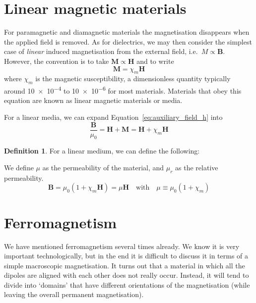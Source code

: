 \documentclass[12pt,chapterprefix=false,dvipsnames]{scrbook}
\theoremstyle{dotless}
\theoremstyle{definition}
\newtheorem{protodefinition}{Definition}[section]
\newenvironment{definition}
{\colorlet{shadecolor}{black!15}\begin{shaded}\begin{protodefinition}}
			{\end{protodefinition}\end{shaded}}
\begin{document}
\section{Linear magnetic materials}%
\label{sec:linear_magnetic_materials}

For paramagnetic and diamagnetic materials the magnetisation
disappears when the applied field is removed. As for
dielectrics, we may then consider the simplest case of
\textit{linear} induced magnetisation from the external
field, i.e.\ $M\propto\bm{B}$. However, the convention is
to take $\bm{M}\propto\bm{H}$ and to write
\begin{equation}
	\bm{M} =
	\chi_{m}\bm{H}
\end{equation}
where $\chi_m$ is the magnetic susceptibility, a
dimensionless quantity typically around \num{10e-4}
to \num{10e-6} for most materials. Materials that
obey this equation are known as linear magnetic materials or
media.

For a linear media, we can expand
Equation~\ref{eq:auxiliary_field_h} into
\begin{equation}
	\frac{\bm{B}}{\mu_{0}}
	=
	\bm{H} + \bm{M}
	=
	\bm{H} + \chi_m\bm{H}
\end{equation}

\begin{definition}
	For a linear medium, we can define the following:

	We define $\mu$ as the permeability of the
	material, and $\mu_r$ as the relative
	permeability.
	\begin{equation}
		\bm{B}
		=
		\mu_{0}\left(1+\chi_m\bm{H}\right)
		=
		\mu\bm{H}
		\hspace{1em}\mathrm{with}\hspace{1em}
		\mu\equiv\mu_{0}\left(1 + \chi_m\right)
	\end{equation}
\end{definition}

\section{Ferromagnetism}%
\label{sec:ferromagnetism}

We have mentioned ferromagnetism several times already. We know
it is very important technologically, but in the end it is
difficult to discuss it in terms of a simple macroscopic
magnetisation. It turns out that a material in which all the
dipoles are aligned with each other does not really occur.
Instead, it will tend to divide into `domains' that have
different orientations of the magnetisation (while leaving the
overall permanent magnetisation).
\end{document}
